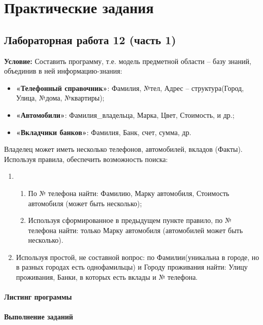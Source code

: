 \chapter{Практические задания}

\section{Лабораторная работа 12 (часть 1)}

\textbf{Условие:} Составить программу, т.е. модель предметной области -- базу знаний, объединив в ней информацию-знания:

\begin{itemize}
	\item \textbf{«Телефонный  справочник»}: Фамилия,  №тел, Адрес -- структура(Город, Улица, №дома, №квартиры);
	\item \textbf{«Автомобили»}: Фамилия\_владельца, Марка, Цвет, Стоимость, и др.;
	\item \textbf{«Вкладчики банков»}: Фамилия, Банк, счет, сумма, др.
\end{itemize} 

Владелец может иметь несколько телефонов, автомобилей, вкладов (Факты). Используя правила, обеспечить возможность поиска:

\begin{enumerate}
	\item \begin{enumerate}
		\item По № телефона найти: Фамилию, Марку автомобиля, Стоимость автомобиля (может быть несколько);
		\item Используя сформированное в предыдущем пункте правило, по № телефона найти: только Марку автомобиля (автомобилей может быть несколько).
	\end{enumerate}

	\item Используя простой, не составной вопрос: по Фамилии(уникальна в городе, но в разных  городах  есть  однофамильцы) и  Городу  проживания  найти: Улицу проживания, Банки, в которых есть вклады и № телефона.
\end{enumerate}

\subsubsection{Листинг программы}




\subsubsection{Выполнение заданий}

